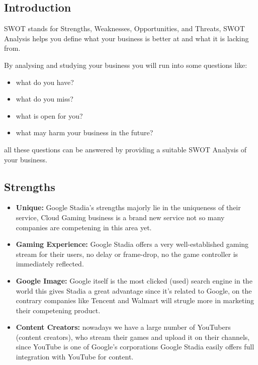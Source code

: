 \subsection{Introduction}

SWOT stands for Strengths, Weaknesses, Opportunities, and Threats, SWOT Analysis helps you define
what your business is better at and what it is lacking from.

By analysing and studying your business you will run into some questions like:
{
\renewcommand\labelitemi{}
\begin{itemize}
    \item what do you have?
    \item what do you miss?
    \item what is open for you?
    \item what may harm your business in the future?
\end{itemize}
}
all these questions can be answered by providing a suitable SWOT Analysis of your business.



\subsection{Strengths}
    \begin{itemize}
        \item \textbf{Unique:} 
            Google Stadia's strengths majorly lie in the uniqueness of their service,
            Cloud Gaming business is a brand new service not so many companies are competening in this
            area yet.
        \item \textbf{Gaming Experience:} Google Stadia offers a very well-established gaming stream for 
            their users, no delay or frame-drop, no the game controller is immediately reflected.
        \item \textbf{Google Image:} Google itself is the most clicked (used) search engine in the world
            this gives Stadia a great advantage since it's related to Google, on the contrary companies
            like Tencent and Walmart will strugle more in marketing their competening product.
        \item \textbf{Content Creators:} 
            nowadays we have a large number of YouTubers (content creators), who stream their games and 
            upload it on their channels, since YouTube is one of Google's corporations Google Stadia
            easily offers full integration with YouTube for content.
    \end{itemize}

